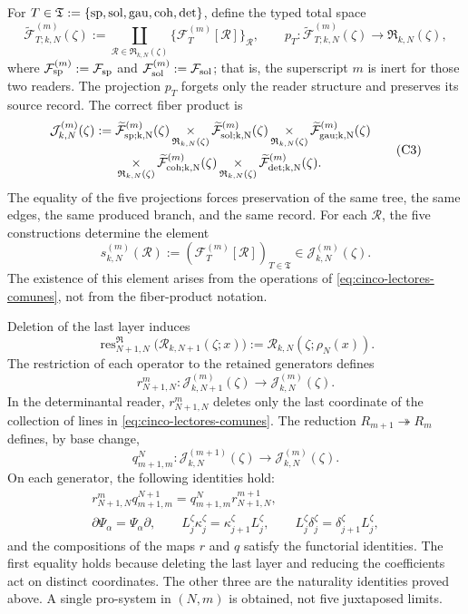 For
\(T\in\mathfrak T:=\{{\rm sp},{\rm sol},{\rm gau},{\rm coh},{\rm det}\}\),
define the typed total space
\[
 \widetilde{\mathcal F}_{T;k,N}^{(m)}(\zeta)
 :=\coprod_{\mathscr R\in\mathfrak R_{k,N}(\zeta)}
   \{\mathcal F_T^{(m)}[\mathscr R]\}_{\mathscr R},
 \qquad
 p_T:\widetilde{\mathcal F}_{T;k,N}^{(m)}(\zeta)
      \longrightarrow\mathfrak R_{k,N}(\zeta),
\]
where
\(\mathcal F_{\rm sp}^{(m)}:=\mathcal F_{\rm sp}\) and
\(\mathcal F_{\rm sol}^{(m)}:=\mathcal F_{\rm sol}\); that is, the
superscript \(m\) is inert for those two readers.
The projection \(p_T\) forgets only the reader structure and preserves
its source record. The correct fiber product is
\[
\begin{aligned}
 \mathcal J_{k,N}^{(m)}(\zeta):={}&
 \widetilde{\mathcal F}_{\rm sp;k,N}^{(m)}(\zeta)
 \mathop{\times}_{\mathfrak R_{k,N}(\zeta)}
 \widetilde{\mathcal F}_{\rm sol;k,N}^{(m)}(\zeta)
 \mathop{\times}_{\mathfrak R_{k,N}(\zeta)}
 \widetilde{\mathcal F}_{\rm gau;k,N}^{(m)}(\zeta)\\
 &\mathop{\times}_{\mathfrak R_{k,N}(\zeta)}
 \widetilde{\mathcal F}_{\rm coh;k,N}^{(m)}(\zeta)
 \mathop{\times}_{\mathfrak R_{k,N}(\zeta)}
 \widetilde{\mathcal F}_{\rm det;k,N}^{(m)}(\zeta).
\end{aligned}
\tag{C3}
\label{eq:constructor-correlativo}
\]
The equality of the five projections forces preservation of the same tree, the
same edges, the same produced branch, and the same record. For each
\(\mathscr R\), the five constructions determine the element
\[
 s_{k,N}^{(m)}(\mathscr R)
 :=(\mathcal F_T^{(m)}[\mathscr R])_{T\in\mathfrak T}
 \in\mathcal J_{k,N}^{(m)}(\zeta).
\]
The existence of this element arises from the operations of
\eqref{eq:cinco-lectores-comunes}, not from the
fiber-product notation.

Deletion of the last layer induces
\[
 \operatorname{res}^{\mathfrak R}_{N+1,N}
 \bigl(\mathscr R_{k,N+1}(\zeta;x)\bigr)
 :=\mathscr R_{k,N}(\zeta;\rho_N(x)).
\]
The restriction of each operator to the retained generators defines
\[
 r^m_{N+1,N}:\mathcal J_{k,N+1}^{(m)}(\zeta)
 \longrightarrow\mathcal J_{k,N}^{(m)}(\zeta).
\]
In the determinantal reader, \(r^m_{N+1,N}\) deletes only the last
coordinate of the collection of lines in
\eqref{eq:cinco-lectores-comunes}. The reduction
\(R_{m+1}\twoheadrightarrow R_m\) defines, by base change,
\[
 q^N_{m+1,m}:\mathcal J_{k,N}^{(m+1)}(\zeta)
 \longrightarrow\mathcal J_{k,N}^{(m)}(\zeta).
\]
On each generator, the following identities hold:
\[
\begin{gathered}
 r^m_{N+1,N}q^{N+1}_{m+1,m}
 =q^N_{m+1,m}r^{m+1}_{N+1,N},\\
 \partial\Psi_\alpha=\Psi_\alpha\partial,
 \qquad L_j^\zeta\kappa_j^\zeta
       =\kappa_{j+1}^\zeta L_j^\zeta,
 \qquad L_j^\zeta\delta_j^\zeta
       =\delta_{j+1}^\zeta L_j^\zeta,
\end{gathered}
\tag{C4}
\label{eq:naturalidad-D}
\]
and the compositions of the maps \(r\) and \(q\) satisfy the functorial
identities. The first equality holds because deleting the last layer and
reducing the coefficients act on distinct coordinates. The other three
are the naturality identities proved above. A single
pro-system in \((N,m)\) is obtained, not five juxtaposed limits.

